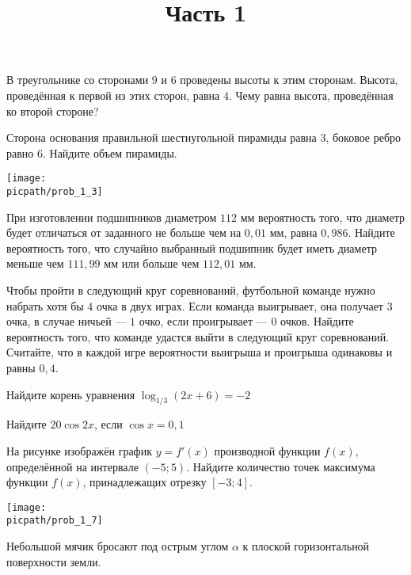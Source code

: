 \begin{training}[2]
	\title{Часть 1}
	\egepreambone
	\begin{listofex}
		\item
		В треугольнике со сторонами \( 9 \) и \( 6 \) проведены высоты
		к этим сторонам. Высота, проведённая к первой из этих сторон, равна \( 4 \). Чему равна высота, проведённая ко второй стороне?
		\foranswer
		\item
		\begin{minipage}[t]{\bodywidth}
			Сторона основания правильной шестиугольной
			пирамиды равна \( 3 \), боковое ребро равно \( 6 \).
			Найдите объем пирамиды.
			\foranswer
		\end{minipage}
		\gapwidth
		\begin{minipage}[t]{\picwidth}
			\texttt{[image: \\picpath/prob\_1\_3]}
		\end{minipage}
		\item При изготовлении подшипников диаметром \( 112 \) мм
		вероятность того, что диаметр будет отличаться от заданного
		не больше чем на \( 0, 01 \) мм, равна \( 0, 986 \).
		Найдите вероятность того, что случайно выбранный подшипник
		будет иметь диаметр меньше чем \( 111, 99 \) мм
		или больше чем \( 112, 01 \) мм.
		\foranswer
		\item Чтобы пройти в следующий круг соревнований,
		футбольной команде нужно набрать хотя бы \( 4 \) очка в двух играх.
		Если команда выигрывает, она получает \( 3 \) очка,
		в случае ничьей --- \( 1 \) очко, если проигрывает --- \( 0 \) очков.
		Найдите вероятность того, что команде удастся выйти в следующий круг соревнований.
		Считайте, что в каждой игре вероятности выигрыша и
		проигрыша одинаковы и равны \( 0,4 \).
		\foranswer
		\newpage
		\hphantom{Часть 1}
		\item Найдите корень уравнения \( \log_{1/3}(2x+6)=-2 \)
		\foranswer
		\item Найдите \( 20\cos2x \), если \( \cos x = 0,1 \)
		\foranswer
		\item 
		На рисунке изображён график \( y = f'(x) \)
		производной функции \( f(x) \),
		определённой на интервале \( (-5; 5) \).
		Найдите количество точек максимума функции \( f(x) \),
		принадлежащих отрезку \( [-3; 4] \).
		\begin{center}
			\texttt{[image: \\picpath/prob\_1\_7]}
		\end{center}
		\foranswer
		\item Небольшой мячик бросают под острым углом \( \alpha \) к плоской горизонтальной поверхности земли.

\end{listofex}
\end{training}
